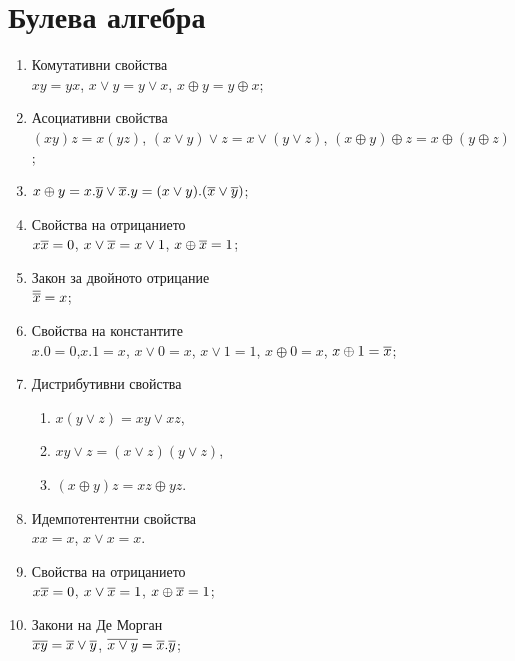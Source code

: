 \chapter{Булева алгебра}

\begin{enumerate}[1)]%
\item
  Комутативни свойства\\
  $xy = yx$, $x\vee y = y\vee x$, $x\oplus y = y\oplus x$;
\item
  Асоциативни свойства\\
  $(xy)z = x(yz)$, $(x\vee y)\vee z = x\vee (y\vee z)$, $(x\oplus y)\oplus z = x\oplus (y\oplus z)$;
\item
  $x\oplus y = x.\overline{y}\vee \overline{x}.y = (x\vee y).(\overline{x}\vee\overline{y})$;
\item
  Свойства на отрицанието\\
  $x\overline{x} = 0$, $x\vee\overline{x} = x\vee 1$, $x\oplus\overline{x} = 1$;
\item
  Закон за двойното отрицание\\
  $\overline{\overline{x}} = x$;
\item
  Свойства на константите\\
  $x.0 = 0$,$x.1 = x$, $x\vee 0 = x$, $x\vee 1 = 1$, $x\oplus 0 = x$, $x\oplus 1 = \overline{x}$;
\item
  Дистрибутивни свойства
  \begin{enumerate}[]
  \item
    $x(y\vee z) = xy \vee xz$,
  \item
    $xy \vee z = (x\vee z)(y\vee z)$,
  \item
    $(x\oplus y)z = xz \oplus yz$.
  \end{enumerate}
\item
  Идемпотентентни свойства\\
  $xx = x$, $x\vee x = x$.
\item
  Свойства на отрицанието\\
  $x\overline{x} = 0$, $x\vee\overline{x} = 1$, $x\oplus\overline{x} = 1$;
\item
  Закони на Де Морган\\
  $\overline{xy} = \overline{x}\vee\overline{y}$, $\overline{x\vee y} = \overline{x}.\overline{y}$;
\end{enumerate}

